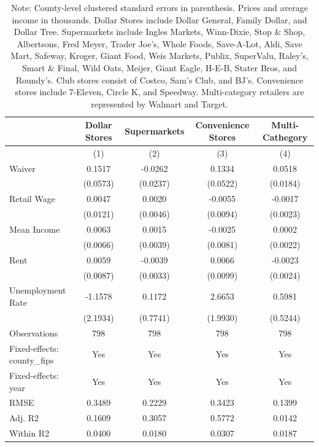 \begin{table}[htbp]
\centering
\caption{Regression Results}
\begin{tabular}{lcccc}
\toprule
 & \multicolumn{1}{c}{Dollar Stores} & \multicolumn{1}{c}{Supermarkets} & \multicolumn{1}{c}{Convenience Stores} & \multicolumn{1}{c}{Multi-Cathegory} \\
\hline
 & (1) & (2) & (3) & (4) \\
\hline
Waiver & 0.1517 & -0.0262 & 0.1334 & 0.0518 \\
 & (0.0573) & (0.0237) & (0.0522) & (0.0184) \\
Retail Wage & 0.0047 & 0.0020 & -0.0055 & -0.0017 \\
 & (0.0121) & (0.0046) & (0.0094) & (0.0023) \\
Mean Income & 0.0063 & 0.0015 & -0.0025 & 0.0002 \\
 & (0.0066) & (0.0039) & (0.0081) & (0.0022) \\
Rent & 0.0059 & -0.0039 & 0.0066 & -0.0023 \\
 & (0.0087) & (0.0033) & (0.0099) & (0.0024) \\
Unemployment Rate & -1.1578 & 0.1172 & 2.6653 & 0.5981 \\
 & (2.1934) & (0.7741) & (1.9930) & (0.5244) \\
\hline
Observations & 798 & 798 & 798 & 798 \\
Fixed-effects: county\_fips & Yes & Yes & Yes & Yes \\
Fixed-effects: year & Yes & Yes & Yes & Yes \\
RMSE & 0.3489 & 0.2229 & 0.3423 & 0.1399 \\
Adj. R2 & 0.1609 & 0.3057 & 0.5772 & 0.0142 \\
Within R2 & 0.0400 & 0.0180 & 0.0307 & 0.0187 \\
\bottomrule
\end{tabular}
\captionsetup{font=small, width=.95\textwidth}
\caption*{Note: County-level clustered standard errors in parenthesis. Prices and average income in thousands.  Dollar Stores include Dollar General, Family Dollar, and Dollar Tree. Supermarkets include Ingles Markets, Winn-Dixie, Stop \& Shop, Albertsons, Fred Meyer, Trader Joe's, Whole Foods, Save-A-Lot, Aldi, Save Mart, Safeway, Kroger, Giant Food, Weis Markets, Publix, SuperValu, Raley's, Smart \& Final, Wild Oats, Meijer, Giant Eagle, H-E-B, Stater Bros, and Roundy's. Club stores consist of Costco, Sam's Club, and BJ's. Convenience stores include 7-Eleven, Circle K, and Speedway. Multi-category retailers are represented by Walmart and Target. }
\label{tab:regression}
\end{table}